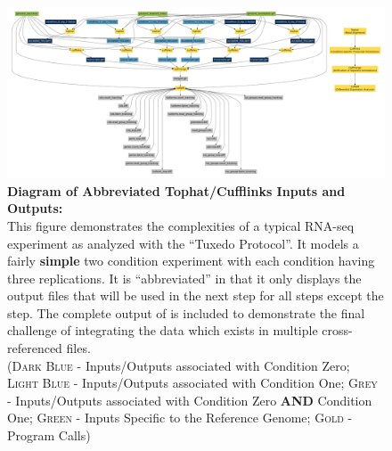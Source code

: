 

\begin{landscape}
 
 
 \begin{figure}[hp]
\centering
\includegraphics[width=\linewidth]{figures/figs/tuxedo_dot/707354_6/tophat_cufflinks_ins_outs.pdf}
\caption[Diagram of Abbreviated Tophat/Cufflinks Inputs and Outputs]{\sf \textbf{Diagram of Abbreviated Tophat/Cufflinks Inputs and Outputs:}\\
	This figure demonstrates the complexities of a typical RNA-seq experiment as analyzed with the ``Tuxedo Protocol''. It models a fairly \textbf{simple} two condition experiment with each condition having three replications. It is ``abbreviated'' in that it only displays the output files that will be used in the next step for all steps except the  step. The complete output of  is included to demonstrate the final challenge of integrating the data which exists in multiple cross-referenced files.\\ 
	(\textsc{Dark Blue} - Inputs/Outputs associated with Condition Zero; 
	\textsc{Light Blue} - Inputs/Outputs associated with Condition One; 
	\textsc{Grey} - Inputs/Outputs associated with Condition Zero \textbf{AND} Condition One; 
	\textsc{Green} - Inputs Specific to the Reference Genome; 
	\textsc{Gold} - Program Calls)
}
	\label{fig:tuxedo}
\end{figure}
 
 
 
\end{landscape}

